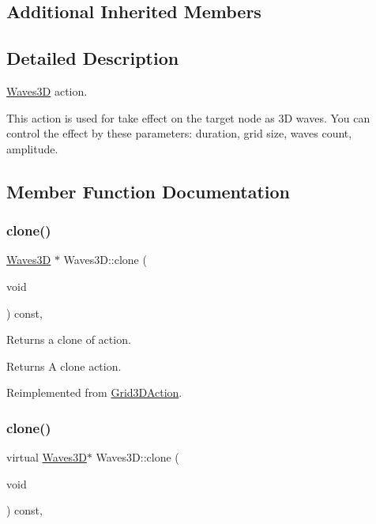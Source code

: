 \subsection*{Additional Inherited Members}


\subsection{Detailed Description}
\hyperlink{classWaves3D}{Waves3D} action. 

This action is used for take effect on the target node as 3D waves. You can control the effect by these parameters\+: duration, grid size, waves count, amplitude. 

\subsection{Member Function Documentation}
\mbox{\label{classWaves3D_ab41b6156741e145fbd6c3626bc16ec25}} 
\subsubsection{\texorpdfstring{clone()}{clone()}\hspace{0.1cm}{\footnotesize\ttfamily [1/2]}}
{\footnotesize\ttfamily \hyperlink{classWaves3D}{Waves3D} $\ast$ Waves3\+D\+::clone (\begin{DoxyParamCaption}\item[{void}]{ }\end{DoxyParamCaption}) const\hspace{0.3cm}{\ttfamily [override]}, {\ttfamily [virtual]}}

Returns a clone of action.

\begin{DoxyReturn}{Returns}
A clone action. 
\end{DoxyReturn}


Reimplemented from \hyperlink{classGrid3DAction_a01d5b2d60654ef66d6551ac2190ed14c}{Grid3\+D\+Action}.

\mbox{\label{classWaves3D_a7f9f49bce0ebd46fc200d208a984b5bf}} 
\subsubsection{\texorpdfstring{clone()}{clone()}\hspace{0.1cm}{\footnotesize\ttfamily [2/2]}}
{\footnotesize\ttfamily virtual \hyperlink{classWaves3D}{Waves3D}$\ast$ Waves3\+D\+::clone (\begin{DoxyParamCaption}\item[{void}]{ }\end{DoxyParamCaption}) const\hspace{0.3cm}{\ttfamily [override]}, {\ttfamily [virtual]}}

